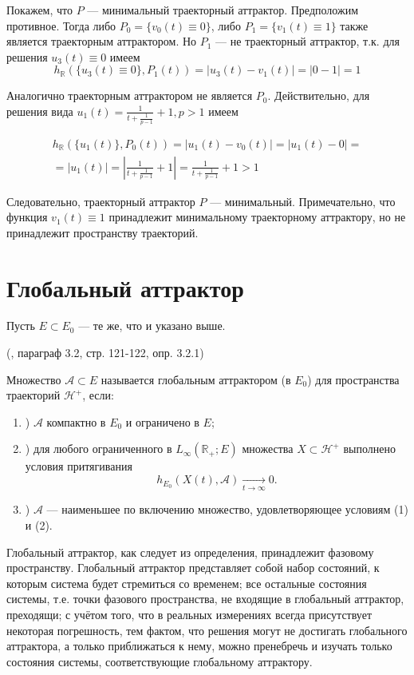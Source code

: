 Покажем, что $P$ --- минимальный траекторный аттрактор.
Предположим противное.
Тогда либо $P_0 =\{v_0(t) \equiv 0\}$, либо $P_1 =\{v_1(t) \equiv 1\}$ также является траекторным аттрактором.
Но $P_1$ --- не траекторный аттрактор, т.к. для решения $u_3(t) \equiv 0$ имеем
\begin{equation}
	h_{\mathbb{R}}(\{u_3(t) \equiv 0 \},P_1(t)) =
	|u_3(t) - v_1(t)| =
	|0-1| =
	1
\end{equation}

Аналогично траекторным аттрактором не является $P_0$.
Действительно, для решения вида $u_1(t)=\frac{1}{t+\frac{1}{p-1}}+1, p > 1$ имеем

\begin{multline}
	h_{\mathbb{R}}(\{u_1(t)\},P_0(t)) =
	|u_1(t) - v_0(t)| =
	|u_1(t) - 0| =
	\\ =
	|u_1(t)| =
	\left| \frac{1}{t+\frac{1}{p-1}}+1 \right| =
	\frac{1}{t+\frac{1}{p-1}}+1 >	1
\end{multline}

Следовательно, траекторный аттрактор $P$ --- минимальный.
Примечательно, что функция $v_1(t) \equiv 1$ принадлежит минимальному траекторному аттрактору,
но не принадлежит пространству траекторий.


\section{Глобальный аттрактор}

Пусть $E\subset E_0$ --- те же, что и указано выше.

\opred (\cite{Zelenaya}, параграф 3.2, стр. 121-122, опр. 3.2.1)

Множество  $\mathcal{A} \subset E $ называется глобальным аттрактором (в $E_0$) для пространства траекторий $\mathcal{H}^+$, если:
\begin{enumerate}
	\item)
		$\mathcal{A}$ компактно в $E_0$ и ограничено в $E$;
	\item)
		для любого ограниченного в $L_\infty(\mathbb{R}_+; E)$ множества $X \subset \mathcal{H}^+$
		выполнено условия притягивания
		$$
			h_{E_0}(X(t),\mathcal{A}) \xrightarrow[t\to \infty]{}{0}.
		$$
	\item)
		$\mathcal{A}$ --- наименьшее по включению множество, удовлетворяющее условиям (1) и (2).
\end{enumerate}


Глобальный аттрактор, как следует из определения, принадлежит фазовому пространству.
Глобальный аттрактор представляет собой набор состояний, к которым система будет стремиться со временем;
все остальные состояния системы, т.е. точки фазового пространства, не входящие в глобальный аттрактор, преходящи;
с учётом того, что в реальных измерениях всегда присутствует некоторая погрешность, тем фактом, что решения могут не достигать глобального аттрактора, а только приближаться к нему, можно пренебречь и изучать только состояния системы, соответствующие глобальному аттрактору.

